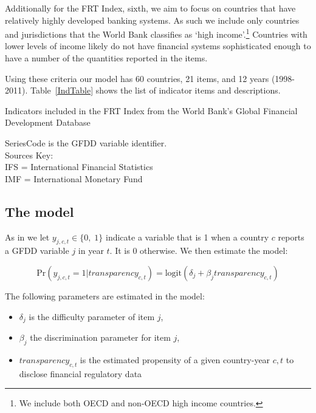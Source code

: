 \documentclass[a4paper]{article}
\begin{document}
Additionally for the FRT Index, sixth, we aim to focus on countries that have relatively highly developed banking systems. As such we include only countries and jurisdictions that the World Bank classifies as `high income'.\footnote{We include both OECD and non-OECD high income countries.} Countries with lower levels of income likely do not have financial systems sophisticated enough to have a number of the quantities reported in the items. 

Using these criteria our model has 60 countries, 21 items, and 12 years (1998-2011). Table~\ref{IndTable} shows the list of indicator items and descriptions.  

\begin{table}[ht]
    \caption{Indicators included in the FRT Index from the World Bank's Global Financial Development Database}
    \label{IndTable}
    \vspace{0.3cm}
    \scalebox{0.95}{
        
    }
    {\scriptsize{SeriesCode is the GFDD variable identifier.\\
    Sources Key:\\ 
    IFS = International Financial Statistics\\
    IMF = International Monetary Fund}}
\end{table}

\subsection{The model}

As in \cite{Hollyer2014} we let $y_{j,c,t} \in \{0,\; 1\}$ indicate a variable that is 1 when a country $c$ reports a GFDD variable $j$ in year $t$. It is 0 otherwise. We then estimate the model:

\begin{equation}
    \mathrm{Pr}(y_{j,c,t} = 1|transparency_{c,t}) = \mathrm{logit}(\delta_{j} + \beta_{j}transparency_{c,t})
\end{equation}

\noindent The following parameters are estimated in the model:

\begin{itemize}
    \item $\delta_{j}$ is the difficulty parameter of item $j$,
    \item $\beta_{j}$ the discrimination parameter for item $j$,
    \item $transparency_{c,t}$ is the estimated propensity of a given country-year $c,t$ to disclose financial regulatory data
\end{itemize}
\end{document}
